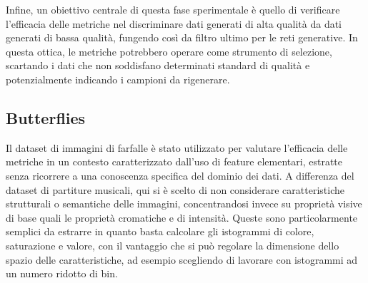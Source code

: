 Infine, un obiettivo centrale di questa fase sperimentale è quello di verificare l'efficacia delle metriche nel discriminare dati generati di alta qualità da dati generati di bassa qualità, 
fungendo così da filtro ultimo per le reti generative. In questa ottica, le metriche potrebbero operare come strumento di selezione, scartando i dati che non soddisfano determinati standard di qualità e potenzialmente indicando i campioni da rigenerare.

\subsection{Butterflies}
\label{subsec:butterflies}

Il dataset di immagini di farfalle è stato utilizzato per valutare l’efficacia delle metriche in un contesto caratterizzato dall’uso di feature elementari, estratte senza ricorrere a una conoscenza specifica del dominio dei dati. 
A differenza del dataset di partiture musicali, qui si è scelto di non considerare caratteristiche strutturali o semantiche delle immagini, concentrandosi invece su proprietà visive di base quali le proprietà cromatiche e di intensità. 
Queste sono particolarmente semplici da estrarre in quanto basta calcolare gli istogrammi di colore, saturazione e valore, con il vantaggio che si può regolare la dimensione dello spazio delle caratteristiche, ad esempio scegliendo di lavorare con istogrammi ad un numero ridotto di bin.


